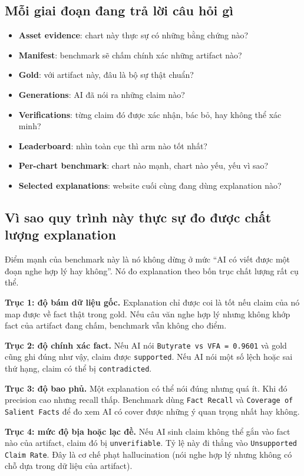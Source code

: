 \documentclass[11pt,a4paper]{article}
\newcommand{\field}[1]{\texttt{#1}}
\begin{document}
\subsection{Mỗi giai đoạn đang trả lời câu hỏi gì}
\begin{itemize}
  \item \textbf{Asset evidence}: chart này thực sự có những bằng chứng nào?
  \item \textbf{Manifest}: benchmark sẽ chấm chính xác những artifact nào?
  \item \textbf{Gold}: với artifact này, đâu là bộ sự thật chuẩn?
  \item \textbf{Generations}: AI đã nói ra những claim nào?
  \item \textbf{Verifications}: từng claim đó được xác nhận, bác bỏ, hay không thể xác minh?
  \item \textbf{Leaderboard}: nhìn toàn cục thì arm nào tốt nhất?
  \item \textbf{Per-chart benchmark}: chart nào mạnh, chart nào yếu, yếu vì sao?
  \item \textbf{Selected explanations}: website cuối cùng đang dùng explanation nào?
\end{itemize}

\subsection{Vì sao quy trình này thực sự đo được chất lượng explanation}
Điểm mạnh của benchmark này là nó không dừng ở mức ``AI có viết được một đoạn nghe hợp lý hay không''.
Nó đo explanation theo bốn trục chất lượng rất cụ thể.

\textbf{Trục 1: độ bám dữ liệu gốc.}
Explanation chỉ được coi là tốt nếu claim của nó map được về fact thật trong gold.
Nếu câu văn nghe hợp lý nhưng không khớp fact của artifact đang chấm, benchmark vẫn không cho điểm.

\textbf{Trục 2: độ chính xác fact.}
Nếu AI nói \field{Butyrate vs VFA = 0.9601} và gold cũng ghi đúng như vậy, claim được \field{supported}.
Nếu AI nói một số lệch hoặc sai thứ hạng, claim có thể bị \field{contradicted}.

\textbf{Trục 3: độ bao phủ.}
Một explanation có thể nói đúng nhưng quá ít.
Khi đó precision cao nhưng recall thấp.
Benchmark dùng \field{Fact Recall} và \field{Coverage of Salient Facts} để đo xem AI có cover được những ý quan trọng nhất hay không.

\textbf{Trục 4: mức độ bịa hoặc lạc đề.}
Nếu AI sinh claim không thể gắn vào fact nào của artifact, claim đó bị \field{unverifiable}.
Tỷ lệ này đi thẳng vào \field{Unsupported Claim Rate}.
Đây là cơ chế phạt hallucination (nói nghe hợp lý nhưng không có chỗ dựa trong dữ liệu của artifact).
\end{document}
